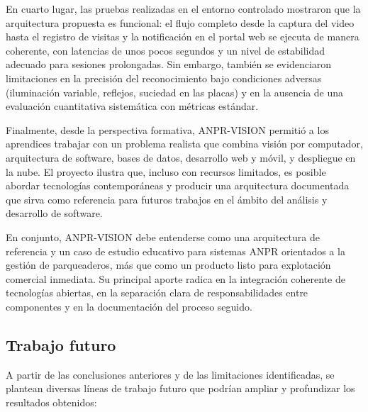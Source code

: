 En cuarto lugar, las pruebas realizadas en el entorno controlado mostraron que la arquitectura propuesta es funcional: el flujo completo desde la captura del video hasta el registro de visitas y la notificación en el portal web se ejecuta de manera coherente, con latencias de unos pocos segundos y un nivel de estabilidad adecuado para sesiones prolongadas. Sin embargo, también se evidenciaron limitaciones en la precisión del reconocimiento bajo condiciones adversas (iluminación variable, reflejos, suciedad en las placas) y en la ausencia de una evaluación cuantitativa sistemática con métricas estándar.

Finalmente, desde la perspectiva formativa, ANPR-VISION permitió a los aprendices trabajar con un problema realista que combina visión por computador, arquitectura de software, bases de datos, desarrollo web y móvil, y despliegue en la nube. El proyecto ilustra que, incluso con recursos limitados, es posible abordar tecnologías contemporáneas y producir una arquitectura documentada que sirva como referencia para futuros trabajos en el ámbito del análisis y desarrollo de software.

En conjunto, ANPR-VISION debe entenderse como una arquitectura de referencia y un caso de estudio educativo para sistemas ANPR orientados a la gestión de parqueaderos, más que como un producto listo para explotación comercial inmediata. Su principal aporte radica en la integración coherente de tecnologías abiertas, en la separación clara de responsabilidades entre componentes y en la documentación del proceso seguido.

\subsection{Trabajo futuro}

A partir de las conclusiones anteriores y de las limitaciones identificadas, se plantean diversas líneas de trabajo futuro que podrían ampliar y profundizar los resultados obtenidos:

